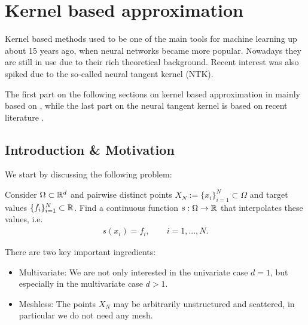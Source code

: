 \chapter{Kernel based approximation} %

\label{Chapter4} %
\setcounter{chapter}{4}
Kernel based methods used to be one of the main tools for machine learning up about 15 years ago, 
when neural networks became more popular.
Nowadays they are still in use due to their rich theoretical background. 
Recent interest was also spiked due to the so-called neural tangent kernel (NTK).

The first part on the following sections on kernel based approximation in mainly based on \cite{wendland2005scattered},
while the last part on the neural tangent kernel is based on recent literature \cite{jacot2018neural}.


\section{Introduction \& Motivation}

We start by discussing the following problem:

\begin{problem}
\label{prob:interpolation_problem}
Consider $\Omega \subset \mathbb{R}^d$ and pairwise distinct points $X_N := \{ x_i \}_{i=1}^N \subset \Omega$ and target values $\{ f_i \}_{i=1}^N \subset \mathbb{R}$.
Find a continuous function $s: \Omega \rightarrow \mathbb{R}$ that interpolates these values, i.e.\
\begin{align}
\label{eq:interpol_conditions}
s(x_i) = f_i, \qquad i=1, ..., N.
\end{align}
\end{problem}

There are two key important ingredients:
\begin{itemize}
\item Multivariate: We are not only interested in the univariate case $d=1$, but especially in the multivariate case $d>1$.
\item Meshless: The points $X_N$ may be arbitrarily unstructured and scattered, in particular we do not need any mesh.
\end{itemize}

